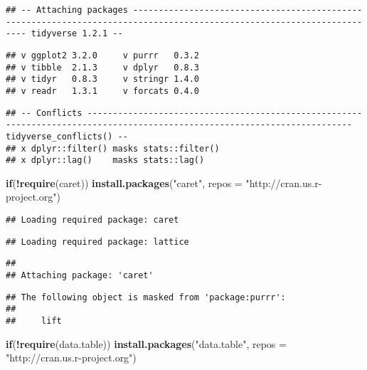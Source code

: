 \documentclass[]{article}
\newenvironment{Shaded}{\begin{snugshade}}{\end{snugshade}}
\newcommand{\KeywordTok}[1]{\textcolor[rgb]{0.13,0.29,0.53}{\textbf{#1}}}
\newcommand{\DataTypeTok}[1]{\textcolor[rgb]{0.13,0.29,0.53}{#1}}
\newcommand{\StringTok}[1]{\textcolor[rgb]{0.31,0.60,0.02}{#1}}
\newcommand{\ControlFlowTok}[1]{\textcolor[rgb]{0.13,0.29,0.53}{\textbf{#1}}}
\newcommand{\OperatorTok}[1]{\textcolor[rgb]{0.81,0.36,0.00}{\textbf{#1}}}
\newcommand{\NormalTok}[1]{#1}
\begin{document}
\begin{verbatim}
## -- Attaching packages ----------------------------------------------------------------------------------------------------------------------- tidyverse 1.2.1 --
\end{verbatim}

\begin{verbatim}
## v ggplot2 3.2.0     v purrr   0.3.2
## v tibble  2.1.3     v dplyr   0.8.3
## v tidyr   0.8.3     v stringr 1.4.0
## v readr   1.3.1     v forcats 0.4.0
\end{verbatim}

\begin{verbatim}
## -- Conflicts -------------------------------------------------------------------------------------------------------------------------- tidyverse_conflicts() --
## x dplyr::filter() masks stats::filter()
## x dplyr::lag()    masks stats::lag()
\end{verbatim}

\begin{Shaded}
\begin{Highlighting}[]
\ControlFlowTok{if}\NormalTok{(}\OperatorTok{!}\KeywordTok{require}\NormalTok{(caret)) }\KeywordTok{install.packages}\NormalTok{(}\StringTok{"caret"}\NormalTok{, }\DataTypeTok{repos =} \StringTok{"http://cran.us.r-project.org"}\NormalTok{)}
\end{Highlighting}
\end{Shaded}

\begin{verbatim}
## Loading required package: caret
\end{verbatim}

\begin{verbatim}
## Loading required package: lattice
\end{verbatim}

\begin{verbatim}
## 
## Attaching package: 'caret'
\end{verbatim}

\begin{verbatim}
## The following object is masked from 'package:purrr':
## 
##     lift
\end{verbatim}

\begin{Shaded}
\begin{Highlighting}[]
\ControlFlowTok{if}\NormalTok{(}\OperatorTok{!}\KeywordTok{require}\NormalTok{(data.table)) }\KeywordTok{install.packages}\NormalTok{(}\StringTok{"data.table"}\NormalTok{, }\DataTypeTok{repos =} \StringTok{"http://cran.us.r-project.org"}\NormalTok{)}
\end{Highlighting}
\end{Shaded}
\end{document}
